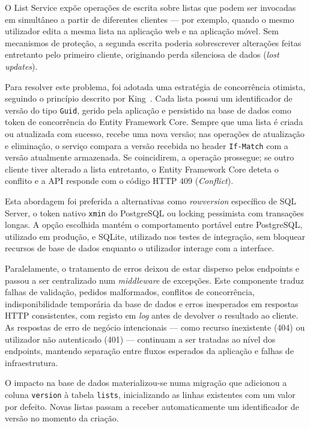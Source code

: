 O List Service expõe operações de escrita sobre listas que podem ser invocadas em simultâneo a partir de diferentes clientes — por exemplo, quando o mesmo utilizador edita a mesma lista na aplicação web e na aplicação móvel. Sem mecanismos de proteção, a segunda escrita poderia sobrescrever alterações feitas entretanto pelo primeiro cliente, originando perda silenciosa de dados (\textit{lost updates}).

Para resolver este problema, foi adotada uma estratégia de concorrência otimista, seguindo o princípio descrito por King~\cite{king-optimistic-concurrency}. Cada lista possui um identificador de versão do tipo \texttt{Guid}, gerido pela aplicação e persistido na base de dados como token de concorrência do Entity Framework Core. Sempre que uma lista é criada ou atualizada com sucesso, recebe uma nova versão; nas operações de atualização e eliminação, o serviço compara a versão recebida no header \texttt{If-Match} com a versão atualmente armazenada. Se coincidirem, a operação prossegue; se outro cliente tiver alterado a lista entretanto, o Entity Framework Core deteta o conflito e a API responde com o código HTTP 409 (\textit{Conflict}).

Esta abordagem foi preferida a alternativas como \textit{rowversion} específico de SQL Server, o token nativo \texttt{xmin} do PostgreSQL ou locking pessimista com transações longas. A opção escolhida mantém o comportamento portável entre PostgreSQL, utilizado em produção, e SQLite, utilizado nos testes de integração, sem bloquear recursos de base de dados enquanto o utilizador interage com a interface.

Paralelamente, o tratamento de erros deixou de estar disperso pelos endpoints e passou a ser centralizado num \textit{middleware} de excepções. Este componente traduz falhas de validação, pedidos malformados, conflitos de concorrência, indisponibilidade temporária da base de dados e erros inesperados em respostas HTTP consistentes, com registo em \textit{log} antes de devolver o resultado ao cliente. As respostas de erro de negócio intencionais — como recurso inexistente (404) ou utilizador não autenticado (401) — continuam a ser tratadas ao nível dos endpoints, mantendo separação entre fluxos esperados da aplicação e falhas de infraestrutura.

O impacto na base de dados materializou-se numa migração que adicionou a coluna \texttt{version} à tabela \texttt{lists}, inicializando as linhas existentes com um valor por defeito. Novas listas passam a receber automaticamente um identificador de versão no momento da criação.

